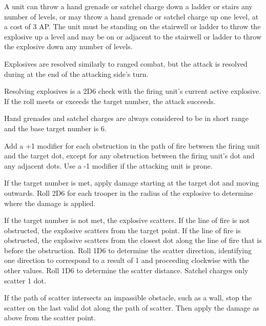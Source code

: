 A unit can throw a hand grenade or satchel charge down a ladder or stairs any number of levels, or may throw a hand grenade or satchel charge up one level, at a cost of 3 AP.
The unit must be standing on the stairwell or ladder to throw the explosive up a level and may be on or adjacent to the stairwell or ladder to throw the explosive down any number of levels.

Explosives are resolved similarly to ranged combat, but the attack is resolved during at the end of the attacking side's turn.

Resolving explosives is a 2D6 check with the firing unit's current active explosive.
If the roll meets or exceeds the target number, the attack succeeds.

Hand grenades and satchel charges are always considered to be in short range and the base target number is 6.

Add a +1 modifier for each obstruction in the path of fire between the firing unit and the target dot, except for any obstruction between the firing unit's dot and any adjacent dots.
Use a -1 modifier if the attacking unit is prone.

If the target number is met, apply damage starting at the target dot and moving outwards.
Roll 2D6 for each trooper in the radius of the explosive to determine where the damage is applied.

If the target number is not met, the explosive scatters.
If the line of fire is not obstructed, the explosive scatters from the target point.
If the line of fire is obstructed, the explosive scatters from the closest dot along the line of fire that is before the obstruction.
Roll 1D6 to determine the scatter direction, identifying one direction to correspond to a result of 1 and proceeding clockwise with the other values.
Roll 1D6 to determine the scatter distance.
Satchel charges only scatter 1 dot.

If the path of scatter intersects an impassible obstacle, such as a wall, stop the scatter on the last valid dot along the path of scatter.
Then apply the damage as above from the scatter point.
